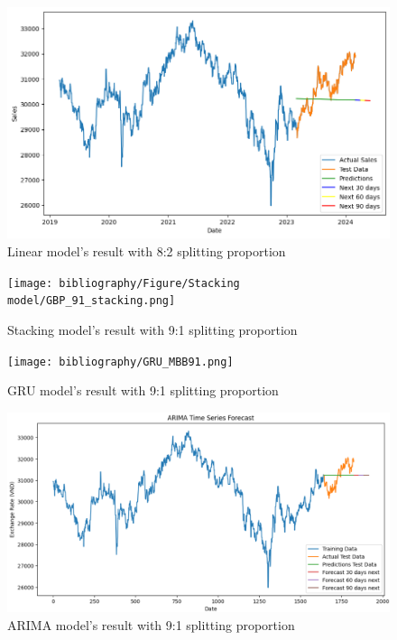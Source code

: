\documentclass{ieeeojies}
\begin{document}
\begin{figure}[H]
  \centering
  \begin{minipage}{0.8\linewidth}
    \centering
    \includegraphics[width=\linewidth]{linear82_GBP.png}
    \caption{Linear model's result with 8:2 splitting proportion}
    \label{fig15}
  \end{minipage}
\end{figure}
\begin{figure}[H]
  \centering
  \begin{minipage}{0.8\linewidth}
    \centering
    \texttt{[image: bibliography/Figure/Stacking model/GBP\_91\_stacking.png]}
    \caption{Stacking model's result with 9:1 splitting proportion}
    \label{fig16}
  \end{minipage}
\end{figure}
\begin{figure}[H]
  \centering
  \begin{minipage}{0.8\linewidth}
    \centering
    \texttt{[image: bibliography/GRU\_MBB91.png]}
    \caption{GRU model's result with 9:1 splitting proportion}
    \label{fig17}
  \end{minipage}
\end{figure}
\begin{figure}[H]
  \centering
  \begin{minipage}{0.8\linewidth}
    \centering
    \includegraphics[width=\linewidth]{ARIMA_GBP.png}
    \caption{ARIMA model's result with 9:1 splitting proportion}
    \label{fig18}
  \end{minipage}
\end{figure}
\end{document}
